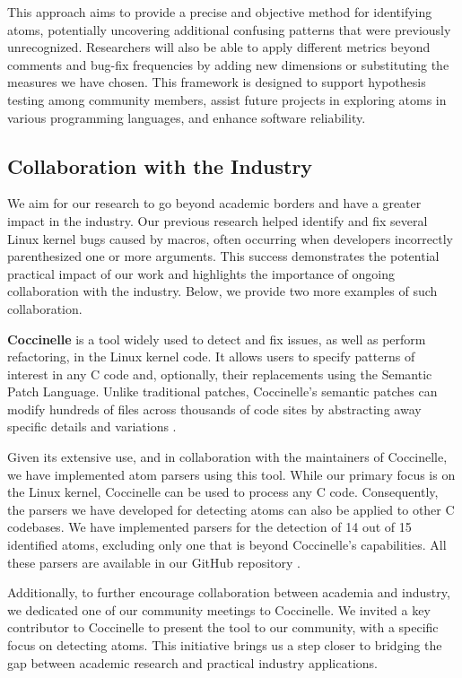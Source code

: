 \documentclass[conference]{IEEEtran}
\begin{document}
This approach aims to provide a precise and objective method 
for identifying atoms, potentially uncovering additional 
confusing patterns that were previously unrecognized. 
Researchers will also be able to apply different metrics 
beyond comments and bug-fix frequencies by adding new 
dimensions or substituting the measures we have chosen. This 
framework is designed to support hypothesis testing among 
community members, assist future projects in exploring atoms 
in various programming languages, and enhance software 
reliability.


\subsection{Collaboration with the Industry}

We aim for our research to go beyond academic borders and have 
a greater impact in the industry. Our previous research helped 
identify and fix several Linux kernel bugs caused by macros, 
often occurring when developers incorrectly parenthesized one 
or more arguments. This success demonstrates the potential 
practical impact of our work and highlights the importance of 
ongoing collaboration with the industry. Below, we provide two 
more examples of such collaboration.

\textbf{Coccinelle} is a tool widely used to detect and fix issues,
as well as perform refactoring, in the Linux kernel code.
It allows users to specify patterns of interest in any C code and,
optionally, their replacements using the Semantic Patch Language.
Unlike traditional patches, Coccinelle's semantic patches can modify hundreds
of files across thousands of code sites by abstracting away specific details
and variations \cite{coccinelle}.

Given its extensive use, and in collaboration with the 
maintainers of Coccinelle, we have implemented atom parsers 
using this tool. While our primary focus is on the Linux 
kernel, Coccinelle can be used to process any C code. 
Consequently, the parsers we have developed for detecting 
atoms can also be applied to other C codebases. We have 
implemented parsers for the detection of 14 out of 15 
identified atoms, excluding only one that is beyond 
Coccinelle's capabilities. All these parsers are available in 
our GitHub repository \cite{githubcocci}.

Additionally, to further encourage collaboration between 
academia and industry, we dedicated one of our community 
meetings to Coccinelle. We invited a key contributor to 
Coccinelle to present the tool to our community, with a 
specific focus on detecting atoms. This initiative brings us a 
step closer to bridging the gap between academic research and 
practical industry applications.
\end{document}
